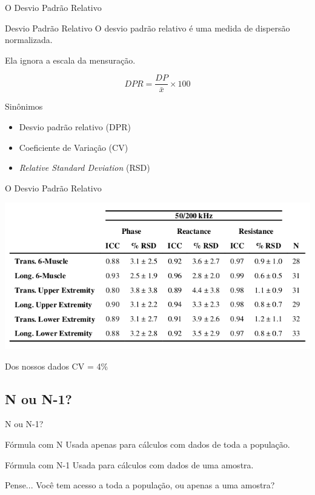 \documentclass{beamer}
\begin{document}
\begin{frame}{\scriptsize O Desvio Padrão Relativo}
  \begin{block}{Desvio Padrão Relativo}
    \footnotesize
    O desvio padrão relativo é uma medida de dispersão \alert{normalizada}.

    \bigskip
    Ela ignora a escala da mensuração.

    $$DPR = \frac{DP}{\bar{x}}\times 100$$
  \end{block}
  \begin{exampleblock}{Sinônimos}
    \footnotesize
    \begin{itemize}
    \footnotesize
    \item Desvio padrão relativo (DPR)
    \item Coeficiente de Variação (CV)
    \item {\em Relative Standard Deviation} (RSD)
  \end{itemize}
  \end{exampleblock}
\end{frame}

\begin{frame}{\scriptsize O Desvio Padrão Relativo}
  \begin{center}
    \includegraphics[width=\textwidth]{Cap3/RSD1}
  \end{center}
  \begin{exampleblock}{Dos nossos dados}
    \footnotesize
    CV = 4\%
  \end{exampleblock}
\end{frame}

\subsection{N ou N-1?}

\begin{frame}{\scriptsize N ou N-1?}
  \begin{block}{Fórmula com N}
    \footnotesize
    Usada apenas para cálculos com dados de toda a população.
  \end{block}
  \begin{block}{Fórmula com N-1}
    \footnotesize
    Usada para cálculos com dados de uma amostra.
  \end{block}
  \begin{block}{Pense...}
    \footnotesize
      Você tem acesso a toda a população, ou apenas a uma amostra?
  \end{block}
\end{frame}
\end{document}
